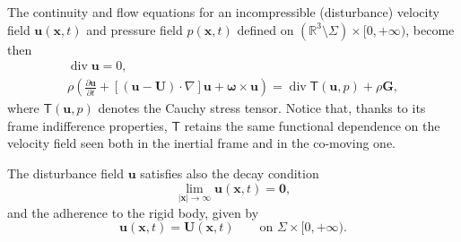 \documentclass[final]{amsart}
\theoremstyle{definition}
\theoremstyle{definition}
\theoremstyle{remark}
\begin{document}
The continuity and flow equations for an incompressible (disturbance)
velocity field ${\boldsymbol u}({\boldsymbol x},t)$ and pressure field $p({\boldsymbol x},t)$
defined on $({\mathbb R}^3\setminus{\Sigma})\times[0,+\infty)$, become then
\begin{gather}\label{eq:incomp}
{\operatorname{\mathrm{div}}}{\boldsymbol u}=0,\\
\rho\left(\frac{{\partial}{\boldsymbol u}}{{\partial} t}+[({\boldsymbol u}-{\boldsymbol U})\cdot\nabla]{\boldsymbol u}+{\boldsymbol \omega}\times{\boldsymbol u}\right)={\operatorname{\mathrm{div}}}{\mathsf T}({\boldsymbol u},p)+\rho{\boldsymbol G},
\end{gather}
where ${\mathsf T}({\boldsymbol u},p)$ denotes the Cauchy stress tensor.  Notice that,
thanks to its frame indifference properties, ${\mathsf T}$ retains the same
functional dependence on the velocity field seen both in the inertial
frame and in the co-moving one.

The disturbance field ${\boldsymbol u}$ satisfies also the decay condition
\begin{equation}\label{eq:decay}
\lim_{|{\boldsymbol x}|\to\infty}{\boldsymbol u}({\boldsymbol x},t)={\boldsymbol 0},
\end{equation}
and the adherence to the rigid body, given by
\begin{equation}\label{eq:adherence}
{\boldsymbol u}({\boldsymbol x},t)={\boldsymbol U}({\boldsymbol x},t)\qquad\text{on }{\Sigma}\times[0,+\infty).
\end{equation}
\end{document}
